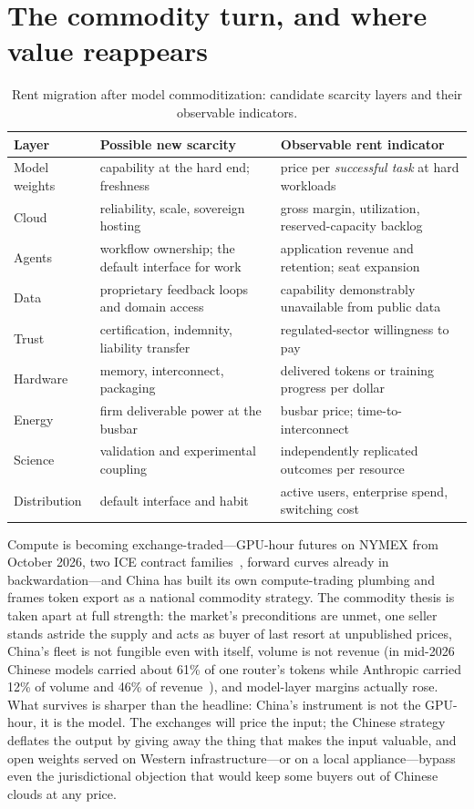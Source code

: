 \section{The commodity turn, and where value reappears}
\begin{table}[htbp]
\centering\footnotesize
\caption{Rent migration after model commoditization: candidate scarcity layers and their observable indicators.}
\label{tab:rentmig}
\begin{tabular}{@{}p{22mm}p{58mm}p{68mm}@{}}
\toprule
\textbf{Layer} & \textbf{Possible new scarcity} & \textbf{Observable rent indicator} \\
\midrule
Model weights & capability at the hard end; freshness & price per \emph{successful task} at hard workloads \\
Cloud & reliability, scale, sovereign hosting & gross margin, utilization, reserved-capacity backlog \\
Agents & workflow ownership; the default interface for work & application revenue and retention; seat expansion \\
Data & proprietary feedback loops and domain access & capability demonstrably unavailable from public data \\
Trust & certification, indemnity, liability transfer & regulated-sector willingness to pay \\
Hardware & memory, interconnect, packaging & delivered tokens or training progress per dollar \\
Energy & firm deliverable power at the busbar & busbar price; time-to-interconnect \\
Science & validation and experimental coupling & independently replicated outcomes per resource \\
Distribution & default interface and habit & active users, enterprise spend, switching cost \\
\bottomrule
\end{tabular}
\end{table}


Compute is becoming exchange-traded---GPU-hour futures on NYMEX from October 2026, two ICE contract families~\cite{cme-compute}, forward curves already in backwardation---and China has built its own compute-trading plumbing and frames token export as a national commodity strategy. The commodity thesis is taken apart at full strength: the market's preconditions are unmet, one seller stands astride the supply and acts as buyer of last resort at unpublished prices, China's fleet is not fungible even with itself, volume is not revenue (in mid-2026 Chinese models carried about 61\% of one router's tokens while Anthropic carried 12\% of volume and 46\% of revenue~\cite{volume-revenue}), and model-layer margins actually rose. What survives is sharper than the headline: China's instrument is not the GPU-hour, it is the model. The exchanges will price the input; the Chinese strategy deflates the output by giving away the thing that makes the input valuable, and open weights served on Western infrastructure---or on a local appliance---bypass even the jurisdictional objection that would keep some buyers out of Chinese clouds at any price.

